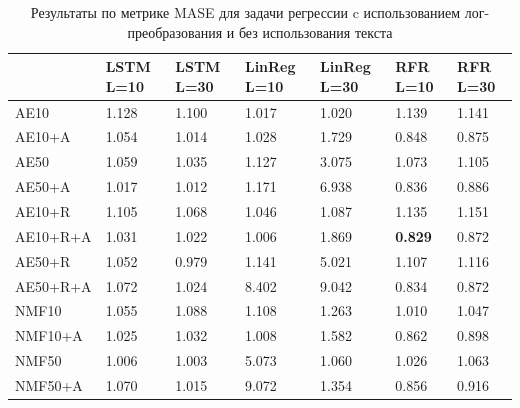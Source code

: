 \begin{table}
\centering
\begin{tabular}{||p{3.8cm}|p{1.5cm}|p{1.5cm}|p{1.5cm}|p{1.5cm}|p{1.5cm}|p{1.5cm}||} 
\hline
& LSTM L=10 & LSTM L=30 & LinReg L=10 & LinReg L=30 & RFR L=10 & RFR L=30\\ \hline\hline
AE10 & 1.128 & 1.100 & 1.017 & 1.020 & 1.139 & 1.141\\ \hline
AE10+A & 1.054 & 1.014 & 1.028 & 1.729 & 0.848 & 0.875\\ \hline
AE50 & 1.059 & 1.035 & 1.127 & 3.075 & 1.073 & 1.105\\ \hline
AE50+A & 1.017 & 1.012 & 1.171 & 6.938 & 0.836 & 0.886\\ \hline
AE10+R & 1.105 & 1.068 & 1.046 & 1.087 & 1.135 & 1.151\\ \hline
AE10+R+A & 1.031 & 1.022 & 1.006 & 1.869 & \textbf{0.829} & 0.872\\ \hline
AE50+R & 1.052 & 0.979 & 1.141 & 5.021 & 1.107 & 1.116\\ \hline
AE50+R+A & 1.072 & 1.024 & 8.402 & 9.042 & 0.834 & 0.872\\ \hline
NMF10 & 1.055 & 1.088 & 1.108 & 1.263 & 1.010 & 1.047\\ \hline
NMF10+A & 1.025 & 1.032 & 1.008 & 1.582 & 0.862 & 0.898\\ \hline
NMF50 & 1.006 & 1.003 & 5.073 & 1.060 & 1.026 & 1.063\\ \hline
NMF50+A & 1.070 & 1.015 & 9.072 & 1.354 & 0.856 & 0.916\\ \hline
\end{tabular}
\caption{Результаты по метрике MASE для задачи регрессии c использованием лог-преобразования и без использования текста}
\label{table:reg-res-no-text-log}
\end{table}

